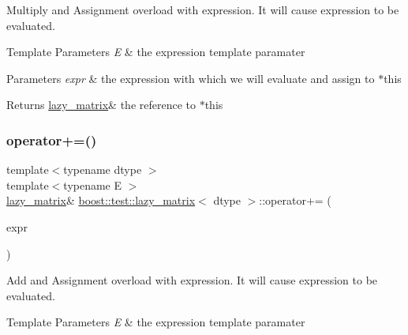 Multiply and Assignment overload with expression. It will cause expression to be evaluated. 


\begin{DoxyTemplParams}{Template Parameters}
{\em E} & the expression template paramater \\
\hline
\end{DoxyTemplParams}

\begin{DoxyParams}{Parameters}
{\em expr} & the expression with which we will evaluate and assign to $\ast$this \\
\hline
\end{DoxyParams}
\begin{DoxyReturn}{Returns}
\mbox{\hyperlink{classboost_1_1test_1_1lazy__matrix}{lazy\+\_\+matrix}}\& the reference to $\ast$this 
\end{DoxyReturn}
\mbox{\label{classboost_1_1test_1_1lazy__matrix_a7bf359d0c31a092abca0ce8b26bf34ef}} 
\subsubsection{\texorpdfstring{operator+=()}{operator+=()}}
{\footnotesize\ttfamily template$<$typename dtype $>$ \\
template$<$typename E $>$ \\
\mbox{\hyperlink{classboost_1_1test_1_1lazy__matrix}{lazy\+\_\+matrix}}\& \mbox{\hyperlink{classboost_1_1test_1_1lazy__matrix}{boost\+::test\+::lazy\+\_\+matrix}}$<$ dtype $>$\+::operator+= (\begin{DoxyParamCaption}\item[{\mbox{\hyperlink{classboost_1_1test_1_1expression}{expression}}$<$ E $>$ const \&}]{expr }\end{DoxyParamCaption})\hspace{0.3cm}{\ttfamily [inline]}}



Add and Assignment overload with expression. It will cause expression to be evaluated. 


\begin{DoxyTemplParams}{Template Parameters}
{\em E} & the expression template paramater \\
\hline
\end{DoxyTemplParams}

